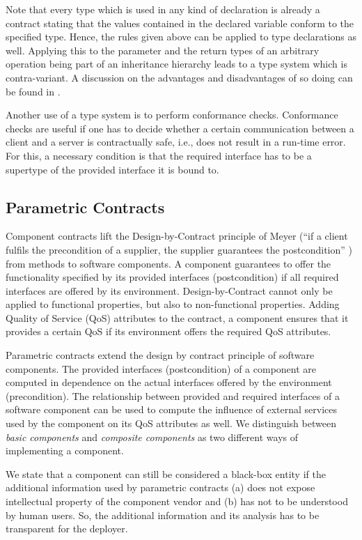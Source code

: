 Note that every type which is used in any kind of declaration is already a contract stating that the values contained in the declared variable conform to the specified type. Hence, the rules given above can be applied to type declarations as well. Applying this to the parameter and the return types of an arbitrary operation being part of an inheritance hierarchy leads to a type system which is contra-variant. A discussion on the advantages and disadvantages of so doing can be found in \cite[p. 628ff]{meyer1997a}.

Another use of a type system is to perform conformance checks. Conformance checks are useful if one has to decide whether a certain communication between a client and a server is contractually safe, i.e., does not result in a run-time error. For this, a necessary condition is that the required interface has to be a supertype of the provided interface it is bound to. 

\subsection{Parametric Contracts}

Component contracts lift the Design-by-Contract principle of Meyer (``if a
client fulfils the precondition of a supplier, the supplier guarantees the
postcondition'' \cite{meyer1992a}) from methods to software components. A
component guarantees to offer the functionality specified by its provided
interfaces (postcondition) if all required interfaces are offered by its
environment. Design-by-Contract cannot only be applied to
functional properties, but also to non-functional properties. Adding Quality of
Service (QoS) attributes to the contract, a component ensures that it
provides a certain QoS if its environment offers the required QoS attributes. 

Parametric contracts \cite{reussner2002c} extend the design by contract
principle of software components. The provided interfaces (postcondition) of a
component are computed in dependence on the actual interfaces offered by the
environment (precondition). The relationship between provided and required
interfaces of a software component can be used to compute the influence of
external services used by the component on its QoS attributes as well. We
distinguish between \emph{basic components} and \emph{composite components} as
two different ways of implementing a component.

We state that a component can still be considered a black-box entity if the
additional information used by parametric contracts (a) does not expose
intellectual property of the component vendor and (b) has not to be understood
by human users. So, the additional information and its analysis has to be
transparent for the deployer.

